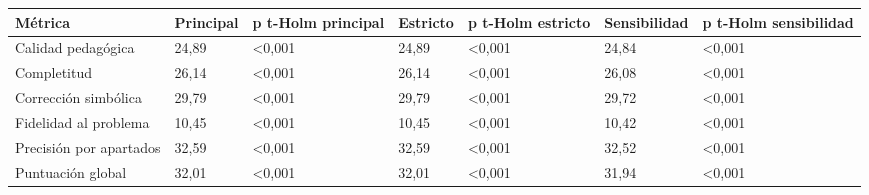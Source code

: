 \begin{tabular}{lllllll}
\toprule
Métrica & Principal & p t-Holm principal & Estricto & p t-Holm estricto & Sensibilidad & p t-Holm sensibilidad \\
\midrule
Calidad pedagógica & 24,89 & <0,001 & 24,89 & <0,001 & 24,84 & <0,001 \\
Completitud & 26,14 & <0,001 & 26,14 & <0,001 & 26,08 & <0,001 \\
Corrección simbólica & 29,79 & <0,001 & 29,79 & <0,001 & 29,72 & <0,001 \\
Fidelidad al problema & 10,45 & <0,001 & 10,45 & <0,001 & 10,42 & <0,001 \\
Precisión por apartados & 32,59 & <0,001 & 32,59 & <0,001 & 32,52 & <0,001 \\
Puntuación global & 32,01 & <0,001 & 32,01 & <0,001 & 31,94 & <0,001 \\
\bottomrule
\end{tabular}
